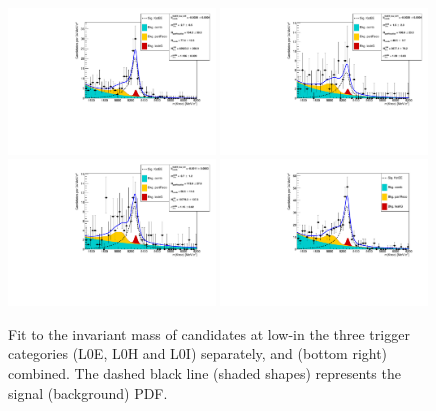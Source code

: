 %
\begin{figure}[h!]
\centering
\includegraphics[width=0.49\textwidth]{RKst/figs/Fit/fit_EE/KstEE_low_L0E.pdf}
\includegraphics[width=0.49\textwidth]{RKst/figs/Fit/fit_EE/KstEE_low_L0H.pdf}
\includegraphics[width=0.49\textwidth]{RKst/figs/Fit/fit_EE/KstEE_low_L0I.pdf}
\includegraphics[width=0.49\textwidth]{RKst/figs/Fit/fit_EE/fit_EEl.pdf}
\caption{Fit to the \mKpiee invariant mass of \BdToKstee candidates at low-\qsq in the three trigger categories (L0E, L0H and L0I) separately, and (bottom right) combined. The dashed black line (shaded shapes) represents the signal (background) PDF.}
\label{fig:fitEE_central}
\end{figure}

